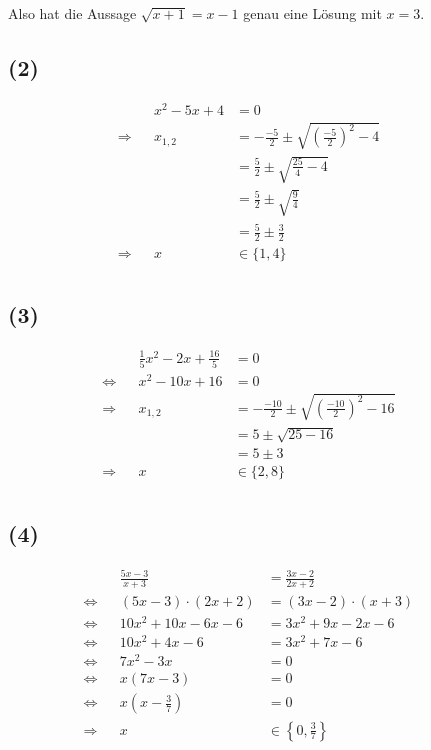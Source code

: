 \documentclass[]{article}
\begin{document}
\begin{samepage}
	Also hat die Aussage $\sqrt{x+1} = x-1$ genau eine Lösung mit $x=3$.
	\end{samepage}

	\subsection*{(2)}
	\begin{samepage}
	\begin{align*}
		&& x^2-5x+4 &=0 &&\\
		\Rightarrow&& x_{1,2}&= -\frac{-5}{2} \pm \sqrt{\left(\frac{-5}{2}\right)^2 - 4 } &&\\
		&& &= \frac{5}{2} \pm \sqrt{\frac{25}{4} - 4 } &&\\
		&& &= \frac{5}{2} \pm \sqrt{\frac{9}{4}} &&\\
		&& &= \frac{5}{2} \pm \frac{3}{2} &&\\
		\Rightarrow&& x&\in \{1,4\} &&\\
	\end{align*}
	\end{samepage}
	\subsection*{(3)}
	\begin{samepage}
	\begin{align*}
		&& \frac{1}{5}x^2-2x+\frac{16}{5} &=0 &&\\
		\Leftrightarrow&& x^2-10x+16 &=0 &&\\
		\Rightarrow&& x_{1,2}&= -\frac{-10}{2} \pm \sqrt{\left(\frac{-10}{2}\right)^2 - 16 } &&\\
		&& &= 5 \pm \sqrt{25 - 16 } &&\\
		&& &= 5 \pm 3 &&\\
		\Rightarrow&& x&\in \{2,8\} &&\\
	\end{align*}
	\end{samepage}
	\subsection*{(4)}
	\begin{samepage}
	\begin{align*}
		&& \frac{5x-3}{x+3} &= \frac{3x-2}{2x+2} &&\\
		\Leftrightarrow&& (5x-3) \cdot (2x+2) &= (3x-2) \cdot (x+3) &&\\
		\Leftrightarrow&& 10x^2 +10x -6x -6 &= 3x^2+9x-2x-6  &&\\
		\Leftrightarrow&& 10x^2+4x-6 &= 3x^2+7x-6  &&\\
		\Leftrightarrow&& 7x^2-3x &= 0 &&\\
		\Leftrightarrow&& x(7x-3) &= 0 &&\\
		\Leftrightarrow&& x \left( x-\frac{3}{7} \right) &= 0 &&\\
		\Rightarrow&& x&\in \left\{0, \frac{3}{7} \right\} &&\\
	\end{align*}
	\end{samepage}
\end{document}
